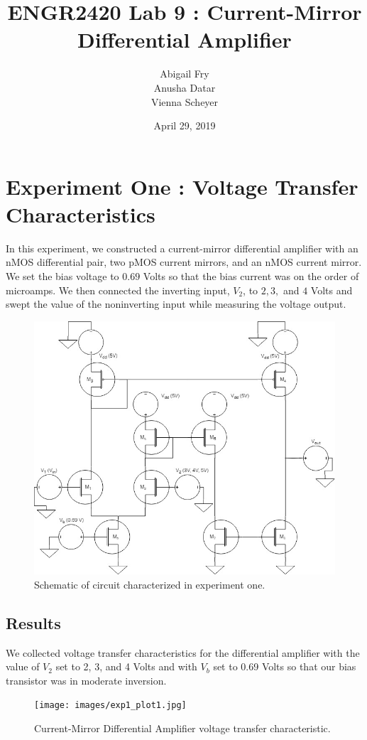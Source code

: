 \documentclass{article}
\title{ENGR2420 Lab 9 : Current-Mirror Differential Amplifier}
\author{Abigail Fry\\ Anusha Datar\\ Vienna Scheyer}
\date{April 29, 2019}
\begin{document}
\maketitle
\section{Experiment One : Voltage Transfer Characteristics}
In this experiment, we constructed a current-mirror differential amplifier with an nMOS differential pair, two pMOS current mirrors, and an nMOS current mirror. We set the bias voltage to $0.69$ Volts so that the bias current was on the order of microamps. We then connected the inverting input, $V_2$, to $2, 3,$ and $4$ Volts and swept the value of the noninverting input while measuring the voltage output. 

\begin{figure}[H]
  \begin{center}      
  \includegraphics[scale = 0.5]{images/exp1_schematic.jpg}
  \caption{Schematic of circuit characterized in experiment one.}   
  \label{fig:exp1_schematic}
  \end{center}
\end{figure}

\subsection{Results}
We collected voltage transfer characteristics for the differential amplifier with the value of $V_2$ set to 2, 3, and 4 Volts and with $V_b$ set to 0.69 Volts so that our bias transistor was in moderate inversion. 
\begin{figure}[H]
  \begin{center}      
  \texttt{[image: images/exp1\_plot1.jpg]}
  \caption{Current-Mirror Differential Amplifier voltage transfer characteristic.}   
  \label{fig:exp1_plot1}
  \end{center}
\end{figure}
\end{document}
